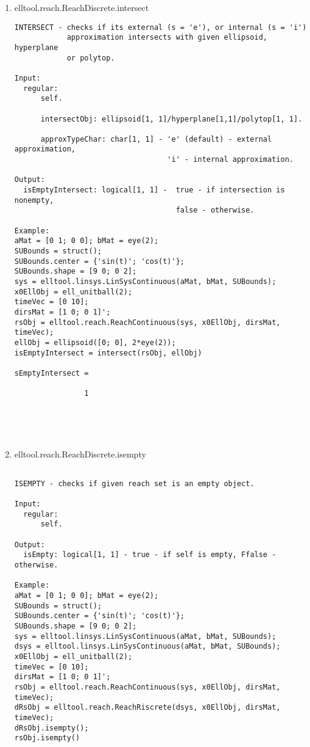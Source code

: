 \begin{enumerate}
\begin{lstlisting}
\end{lstlisting}
\fontfamily{\familydefault}
\selectfont
\item {elltool.reach.ReachDiscrete.intersect}
\selectfont
\begin{lstlisting}
INTERSECT - checks if its external (s = 'e'), or internal (s = 'i')
            approximation intersects with given ellipsoid, hyperplane
            or polytop.

Input:
  regular:
      self.

      intersectObj: ellipsoid[1, 1]/hyperplane[1,1]/polytop[1, 1].

      approxTypeChar: char[1, 1] - 'e' (default) - external approximation,
                                   'i' - internal approximation.

Output:
  isEmptyIntersect: logical[1, 1] -  true - if intersection is nonempty,
                                     false - otherwise.

Example:
aMat = [0 1; 0 0]; bMat = eye(2);
SUBounds = struct();
SUBounds.center = {'sin(t)'; 'cos(t)'};
SUBounds.shape = [9 0; 0 2];
sys = elltool.linsys.LinSysContinuous(aMat, bMat, SUBounds);
x0EllObj = ell_unitball(2);
timeVec = [0 10];
dirsMat = [1 0; 0 1]';
rsObj = elltool.reach.ReachContinuous(sys, x0EllObj, dirsMat, timeVec);
ellObj = ellipsoid([0; 0], 2*eye(2));
isEmptyIntersect = intersect(rsObj, ellObj)

sEmptyIntersect =

                1





\end{lstlisting}
\fontfamily{\familydefault}
\selectfont
\item {elltool.reach.ReachDiscrete.isempty}
\selectfont
\begin{lstlisting}

ISEMPTY - checks if given reach set is an empty object.

Input:
  regular:
      self.

Output:
  isEmpty: logical[1, 1] - true - if self is empty, Ffalse - otherwise.

Example:
aMat = [0 1; 0 0]; bMat = eye(2);
SUBounds = struct();
SUBounds.center = {'sin(t)'; 'cos(t)'};
SUBounds.shape = [9 0; 0 2];
sys = elltool.linsys.LinSysContinuous(aMat, bMat, SUBounds);
dsys = elltool.linsys.LinSysContinuous(aMat, bMat, SUBounds);
x0EllObj = ell_unitball(2);
timeVec = [0 10];
dirsMat = [1 0; 0 1]';
rsObj = elltool.reach.ReachContinuous(sys, x0EllObj, dirsMat, timeVec);
dRsObj = elltool.reach.ReachRiscrete(dsys, x0EllObj, dirsMat, timeVec);
dRsObj.isempty();
rsObj.isempty()


\end{lstlisting}
\end{enumerate}

